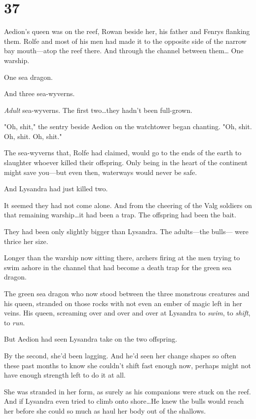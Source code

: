 
\chapter{37}

Aedion's queen was on the reef, Rowan beside her, his father and Fenrys flanking them.
Rolfe and most of his men had made it to the opposite side of the narrow bay mouth---atop the reef there.
And through the channel between them\ldots{} One warship.

One sea dragon.

And three sea-wyverns.

\emph{Adult} sea-wyverns.
The first two\ldots they hadn't been full-grown.

"Oh, shit," the sentry beside Aedion on the watchtower began chanting.
"Oh, shit.
Oh, shit.
Oh, shit."

The sea-wyverns that, Rolfe had claimed, would go to the ends of the earth to slaughter whoever killed their offspring.
Only being in the heart of the continent might save you---but even then, waterways would never be safe.

And Lysandra had just killed two.

It seemed they had not come alone.
And from the cheering of the Valg soldiers on that remaining warship\ldots it had been a trap.
The offspring had been the bait.

They had been only slightly bigger than Lysandra.
The adults---the bulls--- were thrice her size.

Longer than the warship now sitting there, archers firing at the men trying to swim ashore in the channel that had become a death trap for the green sea dragon.

The green sea dragon who now stood between the three monstrous creatures and his queen, stranded on those rocks with not even an ember of magic left in her veins.
His queen, screaming over and over and over at Lysandra to \emph{swim}, to \emph{shift}, to \emph{run}.

But Aedion had seen Lysandra take on the two offspring.

By the second, she'd been lagging.
And he'd seen her change shapes so often these past months to know she couldn't shift fast enough now, perhaps might not have enough strength left to do it at all.

She was stranded in her form, as surely as his companions were stuck on the reef.
And if Lysandra even tried to climb onto shore\ldots He knew the bulls would reach her before she could so much as haul her body out of the shallows.


